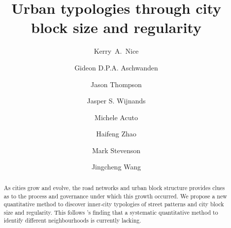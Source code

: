 \documentclass[final,3p,times,authoryear]{elsarticle}
\begin{document}
% 


\begin{frontmatter}



\title{Urban typologies through city block size and regularity}




\author[melb]{Kerry~A.~Nice}
\author[melb]{Gideon D.P.A. Aschwanden}
\author[melb,sun]{Jason Thompson}
\author[melb]{Jasper S. Wijnands}
\author[melb]{Michele Acuto}
\author[melb]{Haifeng Zhao}
\author[melb,pop]{Mark Stevenson}
\author[melb]{Jingcheng Wang}

\address[melb]{Transport, Health, and Urban Design Hub, Faculty of Architecture, Building, and Planning, University of Melbourne, Victoria, Australia}
\address[sun]{Centre for Human Factors and Sociotechnical Systems, University of the Sunshine Coast, Australia}
\address[pop]{Melbourne School of Engineering; and Melbourne School of Population and Global Health, University of Melbourne, Victoria, Australia}




\begin{abstract}

As cities grow and evolve, the road networks and urban block structure provides clues as to the process and governance under which this growth occurred. We propose a new quantitative method to discover inner-city typologies of street patterns and city block size and regularity. This follows \cite{Louf2014a}'s finding that a systematic quantitative method to identify different neighbourhoods is currently lacking. 


\end{abstract}
\end{frontmatter}
\end{document}

